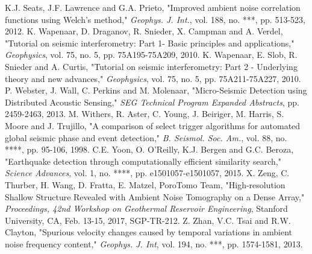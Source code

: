 \documentclass[11pt]{article}
\begin{document}
\begin{thebibliography}{30}
\vspace{-0.2cm}
 K.J. Seats, J.F. Lawrence and G.A. Prieto, "Improved ambient noise correlation functions using Welch's method," \textit{Geophys. J. Int.}, vol. 188, no. ***, pp. 513-523, 2012.
\vspace{-0.2cm}
 K. Wapenaar, D. Draganov, R. Snieder, X. Campman and A. Verdel, "Tutorial on seismic interferometry: Part 1- Basic principles and applications," \textit{Geophysics}, vol. 75, no. 5, pp. 75A195-75A209, 2010.
\vspace{-0.6cm}
 K. Wapenaar, E. Slob, R. Snieder and A. Curtis, "Tutorial on seismic interferometry: Part 2 - Underlying theory and new advances," \textit{Geophysics}, vol. 75, no. 5, pp. 75A211-75A227, 2010.
\vspace{-0.2cm}
 P. Webster, J. Wall, C. Perkins and M. Molenaar, "Micro-Seismic Detection using Distributed Acoustic Sensing," \textit{SEG Technical Program Expanded Abstracts}, pp. 2459-2463, 2013.
\vspace{-0.2cm}
 M. Withers, R. Aster, C. Young, J. Beiriger, M. Harris, S. Moore and J. Trujillo, "A comparison of select trigger algorithms for automated global seismic phase and event detection," \textit{B. Seismol. Soc. Am.}, vol. 88, no. ****, pp. 95-106, 1998.
\vspace{-0.2cm}
 C.E. Yoon, O. O'Reilly, K.J. Bergen and G.C. Beroza, "Earthquake detection through computationally efficient similarity search," \textit{Science Advances}, vol. 1, no. ****, pp. e1501057-e1501057, 2015.
\vspace{-0.2cm}
 X. Zeng, C. Thurber, H. Wang, D. Fratta, E. Matzel, PoroTomo Team, "High-resolution Shallow Structure Revealed with Ambient Noise Tomography on a Dense Array," \textit{Proceedings, 42nd Workshop on Geothermal Reservoir Engineering}, Stanford University, CA, Feb. 13-15, 2017, SGP-TR-212.
\vspace{-0.2cm}
 Z. Zhan, V.C. Tsai and R.W. Clayton, "Spurious velocity changes caused by temporal variations in ambient noise frequency content," \textit{Geophys. J. Int}, vol. 194, no. ***, pp. 1574-1581, 2013.

\end{thebibliography}
\endgroup
\end{document}
